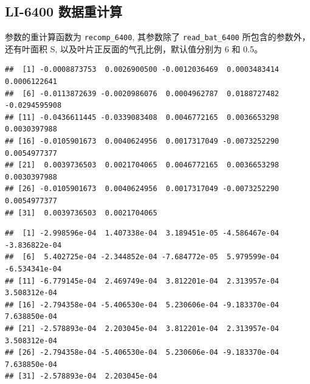 \documentclass[
]{krantz}
\makeatletter
\newenvironment{Shaded}{\begin{snugshade}}{\end{snugshade}}
\newcommand{\DataTypeTok}[1]{\textcolor[rgb]{0.13,0.29,0.53}{#1}}
\newcommand{\DecValTok}[1]{\textcolor[rgb]{0.00,0.00,0.81}{#1}}
\newcommand{\FloatTok}[1]{\textcolor[rgb]{0.00,0.00,0.81}{#1}}
\newcommand{\KeywordTok}[1]{\textcolor[rgb]{0.13,0.29,0.53}{\textbf{#1}}}
\newcommand{\NormalTok}[1]{#1}
\newcommand{\OperatorTok}[1]{\textcolor[rgb]{0.81,0.36,0.00}{\textbf{#1}}}
\newcommand{\StringTok}[1]{\textcolor[rgb]{0.31,0.60,0.02}{#1}}
\newenvironment{kframe}{%
\medskip{}
\setlength{\fboxsep}{.8em}
 \def\at@end@of@kframe{}%
 \ifinner\ifhmode%
  \def\at@end@of@kframe{\end{minipage}}%
  \begin{minipage}{\columnwidth}%
 \fi\fi%
 \def\FrameCommand##1{\hskip\@totalleftmargin \hskip-\fboxsep
 \colorbox{shadecolor}{##1}\hskip-\fboxsep
     \hskip-\linewidth \hskip-\@totalleftmargin \hskip\columnwidth}%
 \MakeFramed {\advance\hsize-\width
   \@totalleftmargin\z@ \linewidth\hsize
   \@setminipage}}%
 {\par\unskip\endMakeFramed%
 \at@end@of@kframe}
\renewenvironment{Shaded}{\begin{kframe}}{\end{kframe}}
\makeatother
\begin{document}
\hypertarget{recompute6400}{%
\subsection{LI-6400 数据重计算}\label{recompute6400}}

参数的重计算函数为 \texttt{recomp\_6400}, 其参数除了 \texttt{read\_bat\_6400} 所包含的参数外，还有叶面积 S, 以及叶片正反面的气孔比例，默认值分别为 6 和 0.5。

\begin{Shaded}
\end{Shaded}

\begin{verbatim}
##  [1] -0.0008873753  0.0026900500 -0.0012036469  0.0003483414  0.0006122641
##  [6] -0.0113872639 -0.0020986076  0.0004962787  0.0188727482 -0.0294595908
## [11] -0.0436611445 -0.0339083408  0.0046772165  0.0036653298  0.0030397988
## [16] -0.0105901673  0.0040624956  0.0017317049 -0.0073252290  0.0054977377
## [21]  0.0039736503  0.0021704065  0.0046772165  0.0036653298  0.0030397988
## [26] -0.0105901673  0.0040624956  0.0017317049 -0.0073252290  0.0054977377
## [31]  0.0039736503  0.0021704065
\end{verbatim}

\begin{Shaded}
\end{Shaded}

\begin{verbatim}
##  [1] -2.998596e-04  1.407338e-04  3.189451e-05 -4.586467e-04 -3.836822e-04
##  [6]  5.402725e-04 -2.344852e-04 -7.684772e-05  5.979599e-04 -6.534341e-04
## [11] -6.779145e-04  2.469749e-04  3.812201e-04  2.313957e-04  3.508312e-04
## [16] -2.794358e-04 -5.406530e-04  5.230606e-04 -9.183370e-04  7.638850e-04
## [21] -2.578893e-04  2.203045e-04  3.812201e-04  2.313957e-04  3.508312e-04
## [26] -2.794358e-04 -5.406530e-04  5.230606e-04 -9.183370e-04  7.638850e-04
## [31] -2.578893e-04  2.203045e-04
\end{verbatim}
\end{document}
